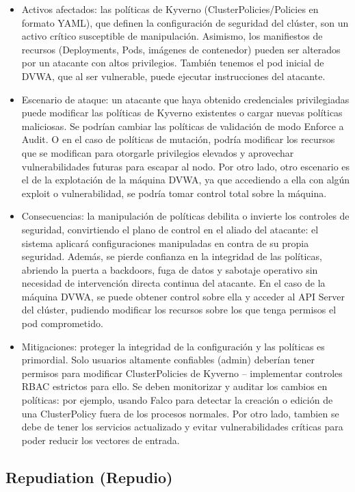 \documentclass[12pt,twoside,titlepage]{report}
\begin{document}
\begin{itemize}
    \item Activos afectados: las políticas de Kyverno (ClusterPolicies/Policies en formato YAML), que definen la configuración de seguridad del clúster, son un activo crítico susceptible de manipulación. Asimismo, los manifiestos de recursos (Deployments, Pods, imágenes de contenedor) pueden ser alterados por un atacante con altos privilegios. También tenemos el pod inicial de DVWA, que al ser vulnerable, puede ejecutar instrucciones del atacante.
    \item Escenario de ataque: un atacante que haya obtenido credenciales privilegiadas puede modificar las políticas de Kyverno existentes o cargar nuevas políticas maliciosas. Se podrían cambiar las políticas de validación de modo Enforce a Audit. O en el caso de políticas de mutación, podría modificar los recursos que se modifican para otorgarle privilegios elevados y aprovechar vulnerabilidades futuras para escapar al nodo.  Por otro lado, otro escenario es el de la explotación de la máquina DVWA, ya que accediendo a ella con algún exploit o vulnerabilidad, se podría tomar control total sobre la máquina.
    \item Consecuencias: la manipulación de políticas debilita o invierte los controles de seguridad, convirtiendo el plano de control en el aliado del atacante: el sistema aplicará configuraciones manipuladas en contra de su propia seguridad. Además, se pierde confianza en la integridad de las políticas, abriendo la puerta a backdoors, fuga de datos y sabotaje operativo sin necesidad de intervención directa continua del atacante. En el caso de la máquina DVWA, se puede obtener control sobre ella y acceder al API Server del clúster, pudiendo  modificar los recursos sobre los que tenga permisos el pod comprometido.
    \item Mitigaciones: proteger la integridad de la configuración y las políticas es primordial. Solo usuarios altamente confiables (admin) deberían tener permisos para modificar ClusterPolicies de Kyverno – implementar controles RBAC estrictos para ello. Se deben monitorizar y auditar los cambios en políticas: por ejemplo, usando Falco para detectar la creación o edición de una ClusterPolicy fuera de los procesos normales. Por otro lado, tambien se debe de tener los servicios actualizado y evitar vulnerabilidades críticas para poder reducir los vectores de entrada.
\end{itemize}

\subsection{Repudiation (Repudio)}
\end{document}
